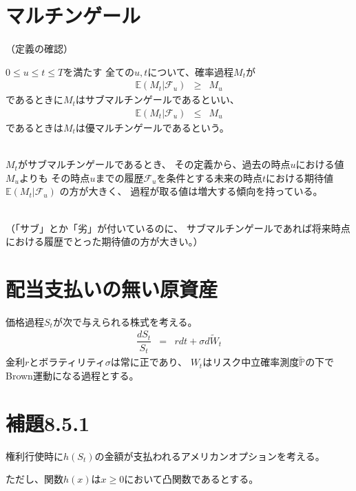 \documentclass[uplatex,a4j,12pt,dvipdfmx]{jsarticle}
\begin{document}
\section{マルチンゲール}

（定義の確認）

$0 \leq u \leq t \leq T$を満たす
全ての$u,t$について、確率過程$M_{t}$が
%
%
\begin{eqnarray*}
	\mathbb{E}(M_{t}|\mathcal{F}_{u})
	&\geq&
	M_{u}
\end{eqnarray*}
%
%
であるときに$M_{t}$はサブマルチンゲールであるといい、
%
%
\begin{eqnarray*}
	\mathbb{E}(M_{t}|\mathcal{F}_{u})
	&\leq&
	M_{u}
\end{eqnarray*}
%
%
であるときは$M_{t}$は優マルチンゲールであるという。

\ \\

$M_{t}$がサブマルチンゲールであるとき、
その定義から、過去の時点$u$における値$M_{u}$よりも
その時点$u$までの履歴$\mathcal{F}_{u}$を条件とする未来の時点$t$における期待値
$\mathbb{E}(M_{t}|\mathcal{F}_{u})$
の方が大きく、
過程が取る値は増大する傾向を持っている。

\ \\

（「サブ」とか「劣」が付いているのに、
サブマルチンゲールであれば将来時点における履歴でとった期待値の方が大きい。）

\section{配当支払いの無い原資産}

価格過程$S_{t}$が次で与えられる株式を考える。
%
%
\begin{eqnarray*}
	\dfrac{d S_{t}}{S_{t}}
	&=&
	r dt + \sigma d \tilde{W}_{t}
\end{eqnarray*}
%
%
金利$r$とボラティリティ$\sigma$は常に正であり、
$W_{t}$はリスク中立確率測度$\tilde{\mathbb{P}}$の下でBrown運動になる過程とする。




\section{補題8.5.1\cite{Shreve2004}}

権利行使時に$h(S_{t})$の金額が支払われるアメリカンオプションを考える。

ただし、関数$h(x)$は$x \geq 0$において凸関数であるとする。
\end{document}
